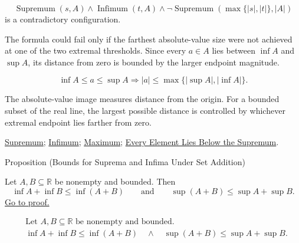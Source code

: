 \begin{remark*}
\[
\operatorname{Supremum}(s,A)\land \operatorname{Infimum}(t,A)
\land
\neg\operatorname{Supremum}(\max\{|s|,|t|\},|A|)
\]
is a contradictory configuration.
\end{remark*}

\begin{remark*}
The formula could fail only if the farthest absolute-value size were not achieved at one of the two extremal thresholds. Since every $a\in A$ lies between $\inf A$ and $\sup A$, its distance from zero is bounded by the larger endpoint magnitude.
\end{remark*}

\begin{remark*}
\[
\inf A\le a\le \sup A
\Longrightarrow
|a|\le \max\{|\sup A|,|\inf A|\}.
\]
\end{remark*}

\begin{remark*}[Interpretation]
The absolute-value image measures distance from the origin. For a bounded subset of the real line, the largest possible distance is controlled by whichever extremal endpoint lies farther from zero.
\end{remark*}

\begin{remark*}[Dependencies]
\hyperref[def:supremum]{Supremum};
\hyperref[def:infimum]{Infimum};
\hyperref[def:maximum]{Maximum};
\hyperref[prop:every-element-lies-below-the-supremum]{Every Element Lies Below the Supremum}.
\end{remark*}



\begin{propositionbox}{Proposition (Bounds for Suprema and Infima Under Set Addition)}
\begin{proposition}
\label{prop:bounds-sum-set}
Let $A,B\subseteq\mathbb{R}$ be nonempty and bounded. Then
\[
  \inf A+\inf B\le \inf(A+B)
  \qquad\text{and}\qquad
  \sup(A+B)\le \sup A+\sup B.
\]
\hyperref[prf:bounds-sum-set]{Go to proof.}
\end{proposition}
\end{propositionbox}

\begin{remark*}
\[
\begin{aligned}
&\text{Let }A,B\subseteq\mathbb{R}\text{ be nonempty and bounded.}\\
&\inf A+\inf B\le \inf(A+B)
\quad\land\quad
\sup(A+B)\le \sup A+\sup B.
\end{aligned}
\]
\end{remark*}

